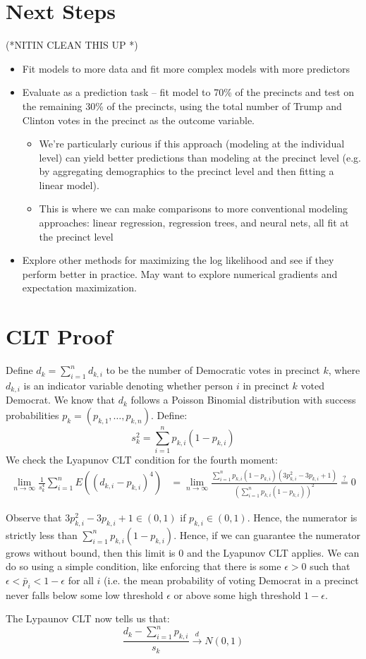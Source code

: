 \documentclass{article}
\begin{document}
\section{Next Steps}
(*NITIN CLEAN THIS UP *)
\begin{itemize}
\item Fit models to more data and fit more complex models with more predictors 
\item Evaluate as a prediction task -- fit model to 70\% of the precincts and test on the remaining 30\% of the precincts, using the total number of Trump and Clinton votes in the precinct as the outcome variable. 
\begin{itemize}
\item We're particularly curious if this approach (modeling at the individual level) can yield better predictions than modeling at the precinct level (e.g. by aggregating demographics to the precinct level and then fitting a linear model). 
\item This is where we can make comparisons to more conventional modeling approaches: linear regression, regression trees, and neural nets, all fit at the precinct level 
\end{itemize}
\item Explore other methods for maximizing the log likelihood and see if they perform better in practice. May want to explore numerical gradients and expectation maximization. 
\end{itemize}

\section{CLT Proof}

Define $d_k = \sum_{i = 1}^n d_{k, i}$ to be the number of Democratic votes in precinct $k$, where $d_{k, i}$ is an indicator variable denoting whether person $i$ in precinct $k$ voted Democrat. We know that $d_k$ follows a Poisson Binomial distribution with success probabilities $p_k = (p_{k, 1}, \dots, p_{k, n})$. Define:
\[ s_{k}^2 = \sum_{i = 1}^{n} p_{k, i} (1-p_{k, i}) \] 
We check the Lyapunov CLT condition for the fourth moment: 
\begin{align*}
\lim_{n \to \infty} \frac{1}{s_k^4} \sum_{i = 1}^n E \left( (d_{k, i} - p_{k, i})^4 \right) &= \lim_{n \to \infty} \frac{\sum_{i = 1}^n p_{k, i}(1-p_{k, i}) \left( 3p_{k, i}^2 - 3p_{k, i} + 1 \right)}{\left(\sum_{i = 1}^n p_{k, i} \left( 1- p_{k, i} \right) \right)^2} \stackrel{?} = 0 
\end{align*}

Observe that $3p_{k, i}^2 - 3p_{k, i} + 1 \in (0, 1)$ if $p_{k, i} \in (0, 1)$. Hence, the numerator is strictly less than $\sum_{i = 1}^n p_{k, i} (1 - p_{k, i})$. Hence, if we can guarantee the numerator grows without bound, then this limit is 0 and the Lyapunov CLT applies. We can do so using a simple condition, like enforcing that there is some $\epsilon > 0$ such that $\epsilon < \bar p_i < 1- \epsilon$ for all $i$ (i.e. the mean probability of voting Democrat in a precinct never falls below some low threshold $\epsilon$ or above some high threshold $1-\epsilon$. 

The Lypaunov CLT now tells us that: 
\[ \frac{d_k - \sum_{i = 1}^{n} p_{k, i} }{s_k} \stackrel{d} \longrightarrow N(0, 1) \] 
\end{document}
